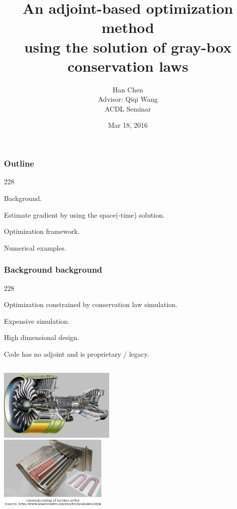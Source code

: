 \documentclass{beamer}
\title{An adjoint-based optimization method\\ using the solution of gray-box conservation laws}
\author{\scriptsize
   Han Chen\\\vspace{0.5cm}
   Advisor: Qiqi Wang\\ \vspace{.5cm}
   ACDL Seminar}
\date{\scriptsize Mar 18, 2016}
\newcommand{\barrow}{\item[\color{darkred}\ding{228}]}
\begin{document}
\begin{frame}
    \titlepage
\end{frame}

\setcounter{framenumber}{0}
\begin{frame}
    \frametitle{Outline}\small
    \begin{dinglist}{228}
        \barrow Background.
        \barrow Estimate gradient by using the space(-time) solution.
        \barrow Optimization framework.
        \barrow Numerical examples.
    \end{dinglist}
\end{frame}


\begin{frame}
    \frametitle{Background \hfill \scriptsize{background}}\small
    \begin{dinglist}{228}
        \barrow Optimization constrained by conservation law simulation.
        \barrow Expensive simulation.
        \barrow High dimensional design.
        \barrow Code has no adjoint and is proprietary / legacy.
    \end{dinglist}
    \begin{columns}
        \centering
            \includegraphics[height=3.5cm]{turbine_1.png}\\
        \centering
            \includegraphics[height=3.5cm]{turbine_2.png}
    \end{columns}
\end{frame}
\end{document}
